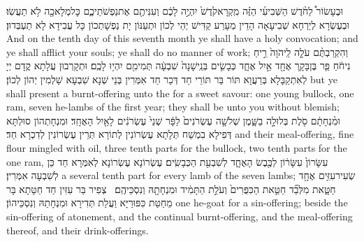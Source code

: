 {וּבֶעָשׂוֹר֩ לַחֹ֨דֶשׁ הַשְּׁבִיעִ֜י הַזֶּ֗ה מִֽקְרָא\maqqaf קֹ֙דֶשׁ֙ יִהְיֶ֣ה לָכֶ֔ם וְעִנִּיתֶ֖ם אֶת\maqqaf נַפְשֹׁתֵיכֶ֑ם כׇּל\maqqaf מְלָאכָ֖ה לֹ֥א תַעֲשֽׂוּ׃}
{וּבְעֶשְׂרָא לְיַרְחָא שְׁבִיעָאָה הָדֵין מְעָרַע קַדִּישׁ יְהֵי לְכוֹן וּתְעַנּוֹן יָת נַפְשָׁתְכוֹן כָּל עֲבִידָא לָא תַעְבְּדוּן׃}
{And on the tenth day of this seventh month ye shall have a holy convocation; and ye shall afflict your souls; ye shall do no manner of work;}{}
{וְהִקְרַבְתֶּ֨ם עֹלָ֤ה לַֽיהֹוָה֙ רֵ֣יחַ נִיחֹ֔חַ פַּ֧ר בֶּן\maqqaf בָּקָ֛ר אֶחָ֖ד אַ֣יִל אֶחָ֑ד כְּבָשִׂ֤ים בְּנֵֽי\maqqaf שָׁנָה֙ שִׁבְעָ֔ה תְּמִימִ֖ם יִהְי֥וּ לָכֶֽם׃}
{וּתְקָרְבוּן עֲלָתָא קֳדָם יְיָ לְאִתְקַבָּלָא בְּרַעֲוָא תּוֹר בַּר תּוֹרֵי חַד דְּכַר חַד אִמְּרִין בְּנֵי שְׁנָא שִׁבְעָא שַׁלְמִין יְהוֹן לְכוֹן׃}
{but ye shall present a burnt-offering unto the \lord\space for a sweet savour: one young bullock, one ram, seven he-lambs of the first year; they shall be unto you without blemish;}{}
{וּמִ֨נְחָתָ֔ם סֹ֖לֶת בְּלוּלָ֣ה בַשָּׁ֑מֶן שְׁלֹשָׁ֤ה עֶשְׂרֹנִים֙ לַפָּ֔ר שְׁנֵי֙ עֶשְׂרֹנִ֔ים לָאַ֖יִל הָאֶחָֽד׃}
{וּמִנְחָתְהוֹן סוּלְתָּא דְּפִילָא בִמְשַׁח תְּלָתָא עֶשְׂרוֹנִין לְתוֹרָא תְּרֵין עֶשְׂרוֹנִין לְדִכְרָא חַד׃}
{and their meal-offering, fine flour mingled with oil, three tenth parts for the bullock, two tenth parts for the one ram,}{}
{עִשָּׂרוֹן֙ עִשָּׂר֔וֹן לַכֶּ֖בֶשׂ הָאֶחָ֑ד לְשִׁבְעַ֖ת הַכְּבָשִֽׂים׃}
{עֶשְׂרוֹנָא עֶשְׂרוֹנָא לְאִמְּרָא חַד כֵּן לְשִׁבְעָה אִמְּרִין׃}
{a several tenth part for every lamb of the seven lambs;}{}
{שְׂעִיר\maqqaf עִזִּ֥ים אֶחָ֖ד חַטָּ֑את מִלְּבַ֞ד חַטַּ֤את הַכִּפֻּרִים֙ וְעֹלַ֣ת הַתָּמִ֔יד וּמִנְחָתָ֖הּ וְנִסְכֵּיהֶֽם׃ \setuma }
{צְפִיר בַּר עִזִּין חַד חַטָּתָא בָּר מֵחַטַּת כִּפּוּרַיָּא וַעֲלַת תְּדִירָא וּמִנְחָתַהּ וְנִסְכֵּיהוֹן׃}
{one he-goat for a sin-offering; beside the sin-offering of atonement, and the continual burnt-offering, and the meal-offering thereof, and their drink-offerings.}{}
